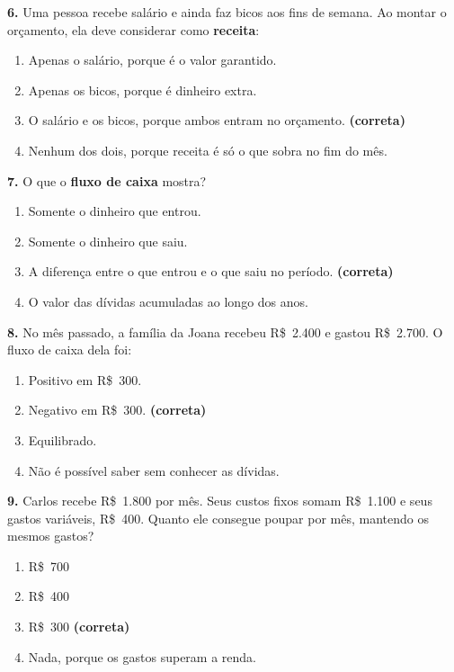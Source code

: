 \vspace{0.3cm}
\noindent\textbf{6.} Uma pessoa recebe salário e ainda faz bicos aos fins de semana. Ao montar o
orçamento, ela deve considerar como \textbf{receita}:
\begin{enumerate}
    \item[(a)] Apenas o salário, porque é o valor garantido.
    \item[(b)] Apenas os bicos, porque é dinheiro extra.
    \item[(c)] O salário e os bicos, porque ambos entram no orçamento. \textbf{(correta)}
    \item[(d)] Nenhum dos dois, porque receita é só o que sobra no fim do mês.
\end{enumerate}

\vspace{0.3cm}
\noindent\textbf{7.} O que o \textbf{fluxo de caixa} mostra?
\begin{enumerate}
    \item[(a)] Somente o dinheiro que entrou.
    \item[(b)] Somente o dinheiro que saiu.
    \item[(c)] A diferença entre o que entrou e o que saiu no período. \textbf{(correta)}
    \item[(d)] O valor das dívidas acumuladas ao longo dos anos.
\end{enumerate}

\vspace{0.3cm}
\noindent\textbf{8.} No mês passado, a família da Joana recebeu R\$~2.400 e gastou R\$~2.700.
O fluxo de caixa dela foi:
\begin{enumerate}
    \item[(a)] Positivo em R\$~300.
    \item[(b)] Negativo em R\$~300. \textbf{(correta)}
    \item[(c)] Equilibrado.
    \item[(d)] Não é possível saber sem conhecer as dívidas.
\end{enumerate}

\vspace{0.3cm}
\noindent\textbf{9.} Carlos recebe R\$~1.800 por mês. Seus custos fixos somam R\$~1.100 e seus
gastos variáveis, R\$~400. Quanto ele consegue poupar por mês, mantendo os mesmos gastos?
\begin{enumerate}
    \item[(a)] R\$~700
    \item[(b)] R\$~400
    \item[(c)] R\$~300 \textbf{(correta)}
    \item[(d)] Nada, porque os gastos superam a renda.
\end{enumerate}

